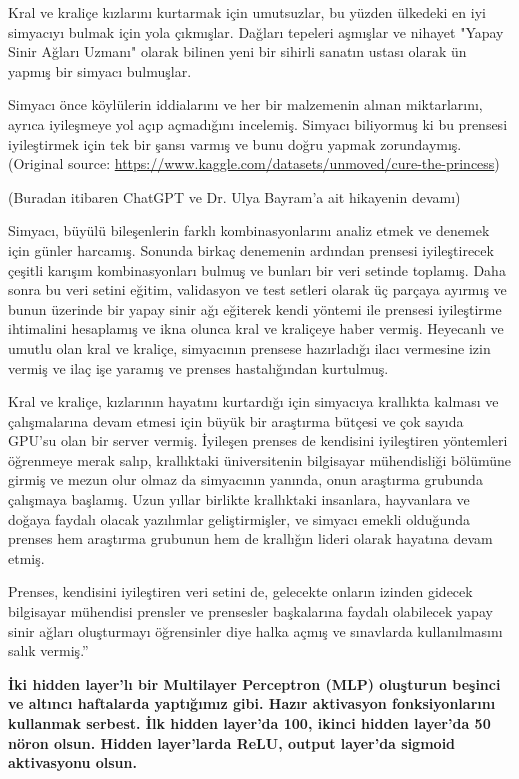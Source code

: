 \documentclass[11pt]{article}
\begin{document}
Kral ve kraliçe kızlarını kurtarmak için umutsuzlar, bu yüzden ülkedeki en iyi simyacıyı bulmak için yola çıkmışlar. Dağları tepeleri aşmışlar ve nihayet "Yapay Sinir Ağları Uzmanı" olarak bilinen yeni bir sihirli sanatın ustası olarak ün yapmış bir simyacı bulmuşlar.

Simyacı önce köylülerin iddialarını ve her bir malzemenin alınan miktarlarını, ayrıca iyileşmeye yol açıp açmadığını incelemiş. Simyacı biliyormuş ki bu prensesi iyileştirmek için tek bir şansı varmış ve bunu doğru yapmak zorundaymış. (Original source: \url{https://www.kaggle.com/datasets/unmoved/cure-the-princess})

(Buradan itibaren ChatGPT ve Dr. Ulya Bayram'a ait hikayenin devamı)

Simyacı, büyülü bileşenlerin farklı kombinasyonlarını analiz etmek ve denemek için günler harcamış. Sonunda birkaç denemenin ardından prensesi iyileştirecek çeşitli karışım kombinasyonları bulmuş ve bunları bir veri setinde toplamış. Daha sonra bu veri setini eğitim, validasyon ve test setleri olarak üç parçaya ayırmış ve bunun üzerinde bir yapay sinir ağı eğiterek kendi yöntemi ile prensesi iyileştirme ihtimalini hesaplamış ve ikna olunca kral ve kraliçeye haber vermiş. Heyecanlı ve umutlu olan kral ve kraliçe, simyacının prensese hazırladığı ilacı vermesine izin vermiş ve ilaç işe yaramış ve prenses hastalığından kurtulmuş.

Kral ve kraliçe, kızlarının hayatını kurtardığı için simyacıya krallıkta kalması ve çalışmalarına devam etmesi için büyük bir araştırma bütçesi ve çok sayıda GPU'su olan bir server vermiş. İyileşen prenses de kendisini iyileştiren yöntemleri öğrenmeye merak salıp, krallıktaki üniversitenin bilgisayar mühendisliği bölümüne girmiş ve mezun olur olmaz da simyacının yanında, onun araştırma grubunda çalışmaya başlamış. Uzun yıllar birlikte krallıktaki insanlara, hayvanlara ve doğaya faydalı olacak yazılımlar geliştirmişler, ve simyacı emekli olduğunda prenses hem araştırma grubunun hem de krallığın lideri olarak hayatına devam etmiş.

Prenses, kendisini iyileştiren veri setini de, gelecekte onların izinden gidecek bilgisayar mühendisi prensler ve prensesler başkalarına faydalı olabilecek yapay sinir ağları oluşturmayı öğrensinler diye halka açmış ve sınavlarda kullanılmasını salık vermiş.''

\textbf{İki hidden layer'lı bir Multilayer Perceptron (MLP) oluşturun beşinci ve altıncı haftalarda yaptığımız gibi. Hazır aktivasyon fonksiyonlarını kullanmak serbest. İlk hidden layer'da 100, ikinci hidden layer'da 50 nöron olsun. Hidden layer'larda ReLU, output layer'da sigmoid aktivasyonu olsun.}
\end{document}
